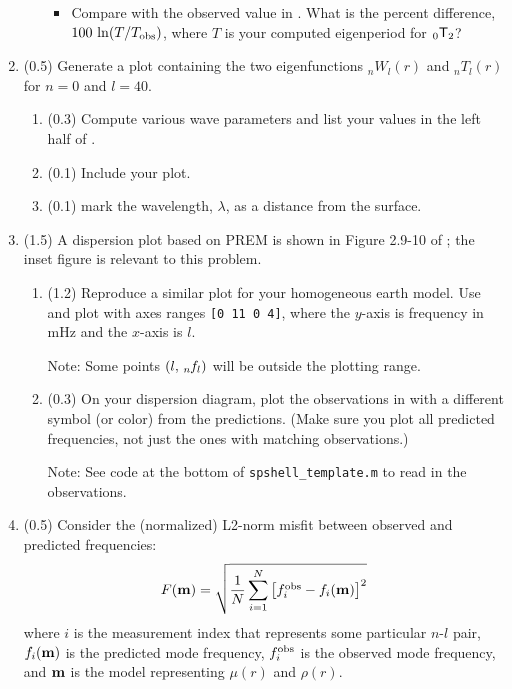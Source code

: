 \documentclass[11pt,titlepage,fleqn]{article}
\newcommand{\tnl}[2]{\mbox{$_{#1}\ssT_{#2}$}}
\newcommand{\Tnl}{\mbox{${}_nT_l$}}   %
\newcommand{\Wnl}{\mbox{${}_nW_l$}}   %
\newcommand{\fnl}{\mbox{${}_{n\hspace{-0.2 mm}}f_l$}}        %
\begin{document}
\begin{enumerate}
\begin{enumerate}
\begin{itemize}
\item Compare with the observed value in . What is the percent difference, $100\,\ln(T/T_{\rm obs})$, where $T$ is your computed eigenperiod for \tnl{0}{2}?
\end{itemize}

\end{enumerate}

\label{prob:l29}


\item (0.5) Generate a plot containing the two eigenfunctions $\Wnl(r)$ and $\Tnl(r)$ for $n=0$ and $l=40$.
%
\begin{enumerate}
\item (0.3) Compute various wave parameters and list your values in the left half of .
\item (0.1) Include your plot.
\item (0.1) mark the wavelength, $\lambda$, as a distance from the surface.
\end{enumerate}

\label{prob:0T40_homo}


\item (1.5) A dispersion plot based on PREM is shown in Figure 2.9-10 of \citet{SteinWysession}; the inset figure is relevant to this problem. 
%
\begin{enumerate}
\item (1.2) Reproduce a similar plot for your homogeneous earth model. Use  and plot with axes ranges \verb+[0 11 0 4]+, where the $y$-axis is frequency in mHz and the $x$-axis is $l$.

Note: Some points $(l,\,\fnl)$ will be outside the plotting range.

\item (0.3) On your dispersion diagram, plot the observations in  with a different symbol (or color) from the predictions. (Make sure you plot all predicted frequencies, not just the ones with matching observations.)

Note: See code at the bottom of \verb+spshell_template.m+ to read in the observations.

\end{enumerate}

\label{prob:disp}


\item (0.5) Consider the (normalized) L2-norm misfit between observed and predicted frequencies:
%
\begin{equation}
F(\mbox{${\bf m}$}) = \sqrt{ \frac{1}{N} \sum_{i=1}^N \left[f_i^{\rm obs} - f_i(\mbox{${\bf m}$})\right]^2 }
\label{Fm}
\end{equation}
%
where $i$ is the measurement index that represents some particular $n$-$l$ pair, $f_i(\mbox{${\bf m}$})$ is the predicted mode frequency, $f_i^{\rm obs}$ is the observed mode frequency, and $\mbox{${\bf m}$}$ is the model representing $\mu(r)$ and $\rho(r)$.


\end{enumerate}
\end{document}
